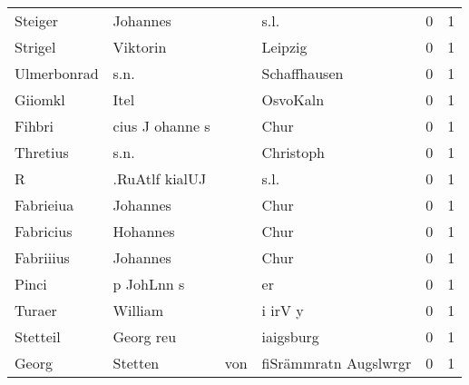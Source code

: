 \begin{center}
\begin{tiny}
\begin{longtabu}{llllrr}
                  Steiger &                           Johannes &             &                                        s.l. &          0 &         1 \\
                  Strigel &                           Viktorin &             &                                     Leipzig &          0 &         1 \\
              Ulmerbonrad &                               s.n. &             &                                Schaffhausen &          0 &         1 \\
                  Giiomkl &                               Itel &             &                                    OsvoKaln &          0 &         1 \\
                   Fihbri &                    cius J ohanne s &             &                                        Chur &          0 &         1 \\
                 Thretius &                               s.n. &             &                                   Christoph &          0 &         1 \\
                        R &                     .RuAtlf kialUJ &             &                                        s.l. &          0 &         1 \\
                Fabrieiua &                           Johannes &             &                                        Chur &          0 &         1 \\
                Fabricius &                           Hohannes &             &                                        Chur &          0 &         1 \\
                Fabriiius &                           Johannes &             &                                        Chur &          0 &         1 \\
                    Pinci &                         p JohLnn s &             &                                          er &          0 &         1 \\
                   Turaer &                            William &             &                                     i irV y &          0 &         1 \\
                 Stetteil &                          Georg reu &             &                                   iaigsburg &          0 &         1 \\
                    Georg &                            Stetten &         von &                       fiSrämmratn Augslwrgr &          0 &         1 \\

\end{longtabu}
\end{tiny}
\end{center}
